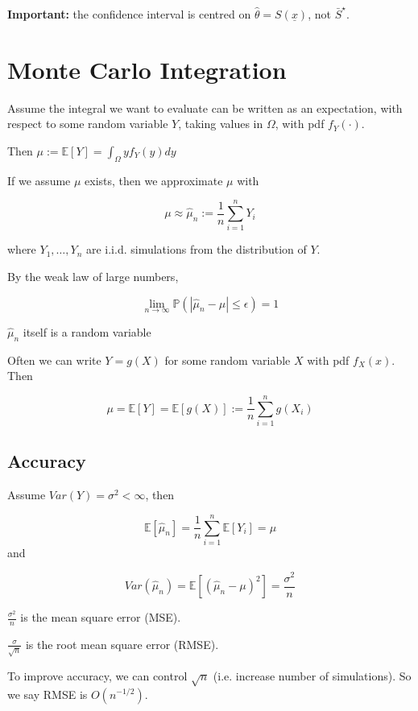 \begin{remark}
	\textbf{Important:} the confidence interval is centred on $\hat{\theta} = S(\underline{x})$, not $\bar{S}^{\star}$.
\end{remark}



\section{Monte Carlo Integration}

Assume the integral we want to evaluate can be written as an expectation, with respect to some random variable $Y$, taking values in $\Omega$, with pdf $f_Y(\cdot)$.

Then $\mu := \mathbb{E}[Y] = \int_{\Omega} y f_Y(y)dy$

If we assume $\mu$ exists, then we approximate $\mu$ with 

\[\mu \approx \hat{\mu}_n := \frac{1}{n} \sum_{i = 1}^{n} Y_i\]

where $Y_1, \dots, Y_n$ are i.i.d. simulations from the distribution of $Y$.

By the weak law of large numbers,

\[\lim_{n \rightarrow \infty} \mathbb{P}(|\hat{\mu}_n - \mu| \le \epsilon) = 1\]

\begin{remark}
	$\hat{\mu}_n$ itself is a random variable
\end{remark}

Often we can write $Y = g(X)$ for some random variable $X$ with pdf $f_X(x)$. Then

\[\mu = \mathbb{E}[Y] = \mathbb{E}[g(X)] := \frac{1}{n} \sum_{i = 1}^{n} g(X_i)\]

\subsection{Accuracy}

Assume $Var(Y) = \sigma^2 < \infty$, then

\[\mathbb{E}[\hat{\mu}_n] = \frac{1}{n} \sum_{i = 1}^{n} \mathbb{E}[Y_i] = \mu\] and 

\[Var(\hat{\mu}_n) = \mathbb{E}[{(\hat{\mu}_n - \mu)} ^ 2] = \frac{\sigma^2}{n}\]

$\frac{\sigma^2}{n}$ is the mean square error (MSE).

$\frac{\sigma}{\sqrt{n}}$ is the root mean square error (RMSE).

To improve accuracy, we can control $\sqrt{n}$ (i.e. increase number of simulations). So we say RMSE is $O(n^{-1 / 2})$.

